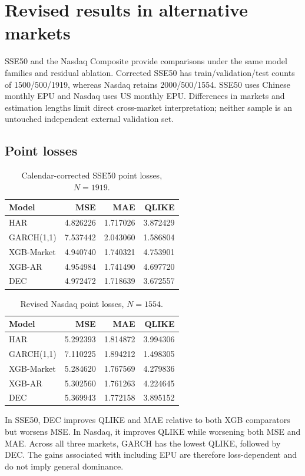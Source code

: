 \section{Revised results in alternative markets}
\label{sec:robustness}
SSE50 and the Nasdaq Composite provide comparisons under the same model families and residual ablation. Corrected SSE50 has train/validation/test counts of 1500/500/1919, whereas Nasdaq retains 2000/500/1554. SSE50 uses Chinese monthly EPU and Nasdaq uses US monthly EPU. Differences in markets and estimation lengths limit direct cross-market interpretation; neither sample is an untouched independent external validation set.

\subsection{Point losses}
\begin{table}[htbp]\centering
\caption{Calendar-corrected SSE50 point losses, $N=1919$.}
\label{tab:sse50_metrics}
\begin{tabular}{lrrr}\toprule Model & MSE & MAE & QLIKE\\\midrule
HAR & 4.826226 & 1.717026 & 3.872429\\
GARCH(1,1) & 7.537442 & 2.043060 & 1.586804\\
XGB-Market & 4.940740 & 1.740321 & 4.753901\\
XGB-AR & 4.954984 & 1.741490 & 4.697720\\
DEC & 4.972472 & 1.718639 & 3.672557\\\bottomrule
\end{tabular}
\end{table}
\begin{table}[htbp]\centering
\caption{Revised Nasdaq point losses, $N=1554$.}
\label{tab:nas_metrics}
\begin{tabular}{lrrr}\toprule Model & MSE & MAE & QLIKE\\\midrule
HAR & 5.292393 & 1.814872 & 3.994306\\
GARCH(1,1) & 7.110225 & 1.894212 & 1.498305\\
XGB-Market & 5.284620 & 1.767569 & 4.279836\\
XGB-AR & 5.302560 & 1.761263 & 4.224645\\
DEC & 5.369943 & 1.772158 & 3.895152\\\bottomrule
\end{tabular}
\end{table}

In SSE50, DEC improves QLIKE and MAE relative to both XGB comparators but worsens MSE. In Nasdaq, it improves QLIKE while worsening both MSE and MAE. Across all three markets, GARCH has the lowest QLIKE, followed by DEC. The gains associated with including EPU are therefore loss-dependent and do not imply general dominance.

